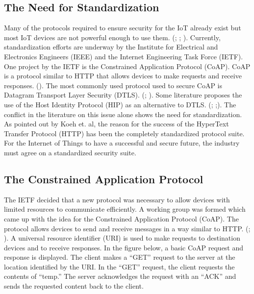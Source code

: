 \documentclass[letterpaper, 12pt]{article}
\begin{document}
\begin{flushleft}
\subsection*{The Need for Standardization}
Many of the protocols required to ensure security for the IoT already exist but most IoT devices are not powerful enough to use them. (\cite{Keoh6817545}; \cite{Granjal7005393}; \cite{Garcia-Morchon:2013:SII:2462096.2462117}). Currently, standardization efforts are underway by the
Institute for Electrical and Electronics Engineers (IEEE) and the Internet Engineering Task Force (IETF). One project by the IETF is the
Constrained Application Protocol (CoAP). CoAP is a protocol similar to HTTP that allows devices to make requests and receive responses. (\cite{Keoh6817545}). The most commonly used protocol used to secure CoAP is Datagram Transport Layer Security (DTLS). (\cite{Keoh6817545}; \cite{Garcia-Morchon:2013:SII:2462096.2462117}). 
Some literature proposes the use of the Host Identity Protocol (HIP) as an alternative to DTLS. (\cite{Hummen}; \cite{Garcia-Morchon:2013:SII:2462096.2462117};). The conflict in the literature on this issue alone shows the need for standardization. As pointed out by Koeh et. al, the reason for the success of the HyperText Transfer Protocol (HTTP) has been the completely standardized protocol suite. For the Internet
of Things to have a successful and secure future, the industry must agree on a standardized security suite.

\subsection*{The Constrained Application Protocol}
The IETF decided that a new protocol was necessary to allow devices with limited resources to communicate efficiently. A working group was formed which came up 
with the idea for the Constrained Application Protocol (CoAP). The protocol allows devices to send and receive messages
in a way similar to HTTP. (\cite{Keoh6817545}; \cite{Capossele}). A universal resource identifier (URI) is used to make requests to destination devices and to
receive responses. In the figure below, a basic CoAP request and response is displayed. The client makes a ``GET'' request to the server at the location identified by the URI. In the ``GET'' request, the client requests the contents of ``temp.'' The server acknowledges the request with an ``ACK'' and sends the requested content back to the client. 


\end{flushleft}
\end{document}
